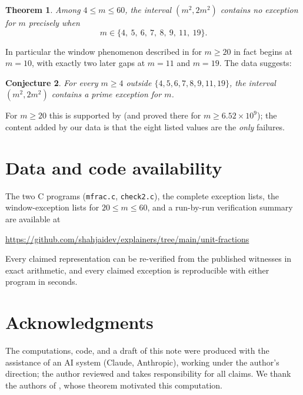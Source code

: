 \documentclass[11pt]{amsart}
\newtheorem{theorem}{Theorem}[section]
\newtheorem{conjecture}[theorem]{Conjecture}
\theoremstyle{remark}
\theoremstyle{definition}
\begin{document}
\begin{theorem}\label{thm:window}
Among $4 \le m \le 60$, the interval $(m^2, 2m^2)$ contains no exception
for $m$ precisely when
\[
m \in \{4,\ 5,\ 6,\ 7,\ 8,\ 9,\ 11,\ 19\}.
\]
\end{theorem}

In particular the window phenomenon described in
\cite{pomeranceweingartner2026} for $m \ge 20$ in fact begins at
$m = 10$, with exactly two later gaps at $m = 11$ and $m = 19$. The data
suggests:

\begin{conjecture}\label{conj:window}
For every $m \ge 4$ outside $\{4,5,6,7,8,9,11,19\}$, the interval
$(m^2, 2m^2)$ contains a prime exception for $m$.
\end{conjecture}

For $m \ge 20$ this is supported by \cite{pomeranceweingartner2026} (and
proved there for $m \ge 6.52\times 10^9$); the content added by our data
is that the eight listed values are the \emph{only} failures.

\section{Data and code availability}

The two C programs (\texttt{mfrac.c}, \texttt{check2.c}), the complete
exception lists, the window-exception lists for $20 \le m \le 60$, and a
run-by-run verification summary are available at
\begin{center}
\url{https://github.com/shahjaidev/explainers/tree/main/unit-fractions}
\end{center}
Every claimed representation can be re-verified from the published
witnesses in exact arithmetic, and every claimed exception is
reproducible with either program in seconds.

\section*{Acknowledgments}

The computations, code, and a draft of this note were produced with the
assistance of an AI system (Claude, Anthropic), working under the
author's direction; the author reviewed and takes responsibility for all
claims. We thank the authors of \cite{pomeranceweingartner2026}, whose
theorem motivated this computation.
\end{document}
